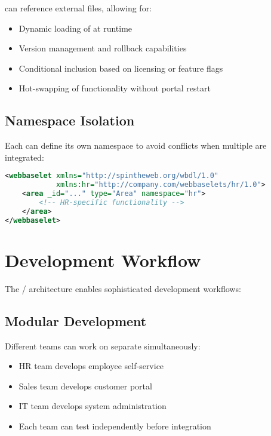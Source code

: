  can reference external \webbaselet{} files, allowing for:
\begin{itemize}
\item Dynamic loading of  at runtime
\item Version management and rollback capabilities
\item Conditional inclusion based on licensing or feature flags
\item Hot-swapping of functionality without portal restart
\end{itemize}

\subsection{Namespace Isolation}

Each \webbaselet{} can define its own namespace to avoid conflicts when multiple  are integrated:

\begin{lstlisting}[language=XML,caption={Webbaselet with Namespace}]
<webbaselet xmlns="http://spintheweb.org/wbdl/1.0"
            xmlns:hr="http://company.com/webbaselets/hr/1.0">
    <area _id="..." type="Area" namespace="hr">
        <!-- HR-specific functionality -->
    </area>
</webbaselet>
\end{lstlisting}

\section{Development Workflow}
\label{sec:development-workflow}

The \webbase{}/\webbaselet{} architecture enables sophisticated development workflows:

\subsection{Modular Development}

Different teams can work on separate  simultaneously:
\begin{itemize}
\item HR team develops employee self-service \webbaselet{}
\item Sales team develops customer portal \webbaselet{}
\item IT team develops system administration \webbaselet{}
\item Each team can test independently before integration
\end{itemize}

